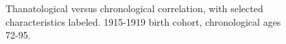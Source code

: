 \documentclass[11pt,oneside]{article} %
\begin{document}
\begin{figure}[!h]
    \centering
    \caption{Thanatological versus chronological correlation, with selected
    characteristics labeled. 1915-1919 birth cohort, chronological ages 72-95.}
    \label{fig:thanochronocorr}
\end{figure}
\end{document}
